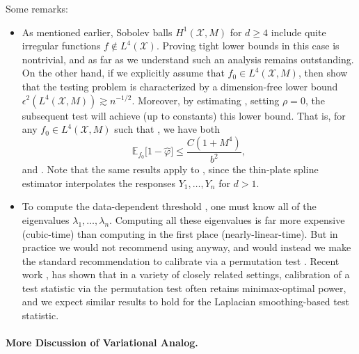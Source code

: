 \documentclass[twoside]{article}
\newcommand{\1}{\mathbf{1}}
\newcommand{\Xset}{\mathcal{X}}
\newcommand{\Leb}{L}
\newcommand{\Ebb}{\mathbb{E}}
\newcommand{\wt}[1]{\widetilde{#1}}
\newcommand{\wh}[1]{\widehat{#1}}
\theoremstyle{definition}
\theoremstyle{remark}
\begin{document}
Some remarks:
\begin{itemize}
	\item As mentioned earlier, Sobolev balls $H^1(\Xset,M)$ for $d \geq 4$ include quite irregular functions $f \not\in \Leb^4(\Xset)$. Proving tight lower bounds in this case is nontrivial, and as far as we understand such an analysis remains outstanding. On the other hand, if we explicitly assume that $f_0 \in \Leb^4(\Xset,M)$, then \citet{guerre02} show that the testing problem is characterized by a dimension-free lower bound $\epsilon^{2}(\Leb^4(\Xset,M)) \gtrsim n^{-1/2}$. Moreover, by estimating \smash{$\wh{f}$}, setting $\rho = 0$, the subsequent test \smash{$\wh{\varphi}$} will achieve (up to constants) this lower bound. That is, for any $f_0 \in \Leb^4(\Xset,M)$ such that \smash{$\|f_0\|_{\Leb^2(\Xset)}^2 \geq C b^2n^{-1/2}$}, we have both
	\begin{equation}
	\label{eqn:laplacian_smoothing_testing_low_smoothness}
	\Ebb_{f_0}\bigl[1 - \wh{\varphi}\bigr] \leq \frac{C(1 + M^4)}{b^2},
	\end{equation} 
	and \smash{$\Ebb_0[\wh{\varphi}] \leq 1/b^2$}. Note that the same results apply to \smash{$\wt{T}$}, since the thin-plate spline estimator \smash{$\wt{f}$} interpolates the responses $Y_1,\ldots,Y_n$ for $d>1$.
	\item To compute the data-dependent threshold \smash{$\wh{t}_b$}, one must know all of the eigenvalues $\lambda_1,\ldots,\lambda_n$. Computing all these eigenvalues is far more expensive (cubic-time) than computing \smash{$\wh{T}$} in the first place (nearly-linear-time). But in practice we would not recommend using \smash{$\wh{t}_b$} anyway, and would instead we make the standard recommendation to calibrate via a permutation test \citep{hoeffding1952}. Recent work \cite{kim2020minimax}, has shown that in a variety of closely related settings, calibration of a test statistic via the permutation test often retains minimax-optimal power, and we expect similar results to hold for the Laplacian smoothing-based test statistic.

\end{itemize}

\paragraph{More Discussion of Variational Analog.}
\end{document}
